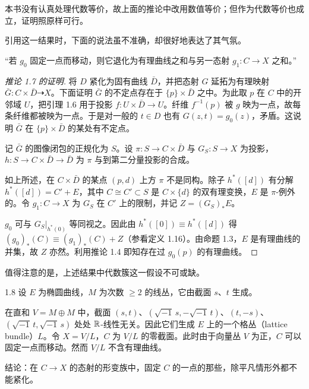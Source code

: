 本书没有认真处理代数等价，故上面的推论中改用数值等价；但作为代数等价也成立，证明照原样可行。

引用这一结果时，下面的说法虽不准确，却很好地表达了其气氛。

“若 $g_0$ 固定一点而移动，则它退化为有理曲线之和与另一态射 $g_1: C\to X$ 之和。”

\begin{proof}[推论 1.7 的证明]
将 $D$ 紧化为固有曲线 $\bar D$，并把态射 $G$ 延拓为有理映射 $\bar G: C\times\bar D\dashrightarrow X$。下面证明 $\bar G$ 的不定点存在于 $\{p\}\times\bar D$ 之中。为此取 $p$ 在 $C$ 中的开邻域 $U$，把引理 1.6 用于投影 $f: U\times\bar D\to U$。纤维 $f^{-1}(p)$ 被 $g$ 映为一点，故每条纤维都被映为一点。于是对一般的 $t\in D$ 也有 $G(z,t)=g_0(z)$，矛盾。这说明 $\bar G$ 在 $\{p\}\times\bar D$ 的某处有不定点。

记 $\bar G$ 的图像闭包的正规化为 $S$。设 $\pi: S\to C\times\bar D$ 与 $G_S: S\to X$ 为投影，$h: S\to C\times\bar D\to\bar D$ 为 $\pi$ 与到第二分量投影的合成。

如上所述，在 $C\times\bar D$ 的某点 $(p,d)$ 上方 $\pi$ 不是同构。除子 $h^*([d])$ 有分解 $h^*([d])=C'+E$，其中 $C\cong C'\subset S$ 是 $C\times\{d\}$ 的双有理变换，$E$ 是 $\pi$-例外的。令 $g_1: C\to X$ 为 $G_S$ 在 $C'$ 上的限制，并记 $Z=(G_S)_*E$。

$g_0$ 可与 $G_S|_{h^*(0)}$ 等同视之。因此由 $h^*([0])\equiv h^*([d])$ 得 $(g_0)_*(C)\equiv (g_1)_*(C)+Z$（参看定义 1.16）。由命题 1.3，$E$ 是有理曲线的并集，故 $Z$ 亦然。利用推论 1.4 即知存在过 $g_0(p)$ 的有理曲线。
\end{proof}

值得注意的是，上述结果中代数簇这一假设不可或缺。

\begin{example}[{[Bla56]}]{1.8}
设 $E$ 为椭圆曲线，$M$ 为次数 $\ge 2$ 的线丛，它由截面 $s$、$t$ 生成。

在直和 $V=M\oplus M$ 中，截面 $(s,t)$、$(\sqrt{-1}\,s,-\sqrt{-1}\,t)$、$(t,-s)$、$(\sqrt{-1}\,t,\sqrt{-1}\,s)$ 处处 $\mathbb{R}$-线性无关。因此它们生成 $E$ 上的一个格丛（lattice bundle）$L$。令 $X=V/L$，$C$ 为 $V/L$ 的零截面。此时由于向量丛 $V$ 为正，$C$ 可以固定一点而移动。然而 $V/L$ 不含有理曲线。

结论：在 $C\to X$ 的态射的形变族中，固定 $C$ 的一点的那些，除平凡情形外都不能紧化。
\end{example}


